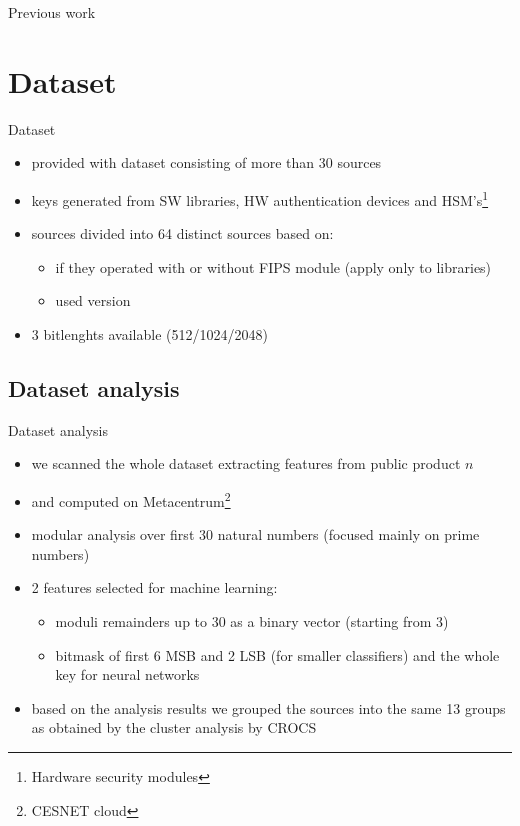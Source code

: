 \documentclass{beamer}
\newcommand\Fontsmall{\fontsize{8}{7.2}\selectfont}
\let\oldfootnote\footnote
\renewcommand\footnote[1][]{\oldfootnote[frame,#1]}
\begin{document}
\begin{darkframes}
\begin{frame}{Previous work}
    \end{frame}

    \section{Dataset}

    \begin{frame}{Dataset}
    
    \begin{itemize}
      \item provided with dataset consisting of more than 30 sources
      \item keys generated from SW libraries, HW authentication devices and HSM's\footnote{Hardware security modules}
      \item sources divided into 64 distinct sources based on:
      \begin{itemize}
        \item if they operated with or without FIPS module (apply only to libraries)
        \item used version
      \end{itemize}
      \item 3 bitlenghts available (512/1024/2048)
    \end{itemize} 
      
    \end{frame}

    \subsection{Dataset analysis}
    \begin{frame}{Dataset analysis}
      \Fontsmall   
      \begin{itemize}
        \item we scanned the whole dataset extracting features from public product $n$
        \item {} and {} computed on Metacentrum\footnote{CESNET cloud}
        \item modular analysis over first 30 natural numbers (focused mainly on prime numbers)
        \item 2 features selected for machine learning:
        
        \begin{itemize}
          \Fontsmall 
          \item moduli remainders up to 30 as a binary vector (starting from 3)
          \item bitmask of first 6 MSB and 2 LSB (for smaller classifiers) and the whole key for neural networks
        \end{itemize}
        \item based on the analysis results we grouped the sources into the same 13 groups as obtained by the cluster analysis by CROCS
      \end{itemize}  
      

\end{frame}
\end{darkframes}
\end{document}
